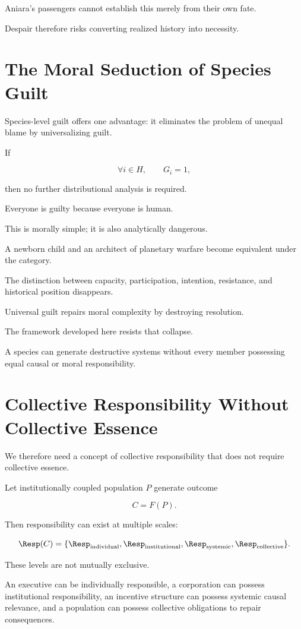\documentclass[11pt,oneside]{book}
\theoremstyle{definition}
\theoremstyle{remark}
\begin{document}
Aniara's passengers cannot establish this merely from their own fate.

Despair therefore risks converting realized history into necessity.

\section{The Moral Seduction of Species Guilt}

Species-level guilt offers one advantage: it eliminates the problem of unequal blame by universalizing guilt.

If

\[
\forall i\in H,
\qquad
G_i=1,
\]

then no further distributional analysis is required.

Everyone is guilty because everyone is human.

This is morally simple; it is also analytically dangerous.

A newborn child and an architect of planetary warfare become equivalent under the category.

The distinction between capacity, participation, intention, resistance, and historical position disappears.

Universal guilt repairs moral complexity by destroying resolution.

The framework developed here resists that collapse.

A species can generate destructive systems without every member possessing equal causal or moral responsibility.

\section{Collective Responsibility Without Collective Essence}

We therefore need a concept of collective responsibility that does not require collective essence.

Let institutionally coupled population \(P\) generate outcome

\[
C=F(P).
\]

Then responsibility can exist at multiple scales:

\[
\Resp(C)
=
\{
\Resp_{\mathrm{individual}},
\Resp_{\mathrm{institutional}},
\Resp_{\mathrm{systemic}},
\Resp_{\mathrm{collective}}
\}.
\]

These levels are not mutually exclusive.

An executive can be individually responsible, a corporation can possess institutional responsibility, an incentive structure can possess systemic causal relevance, and a population can possess collective obligations to repair consequences.
\end{document}

